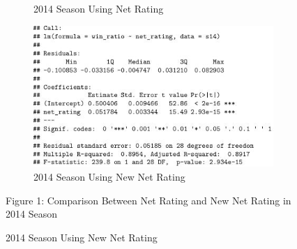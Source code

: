 \documentclass[11pt]{article}
\begin{document}
\begin{figure}[h!]
\begin{subfigure}[b]{0.42\linewidth}
    \caption{2014 Season Using Net Rating}
  \end{subfigure}
  \begin{subfigure}[b]{0.42\linewidth}
    \includegraphics[width=\linewidth]{new_nr_14_summary.jpg}
    \caption{2014 Season Using New Net Rating}
  \end{subfigure}
\bigskip
Figure 1: Comparison Between Net Rating and New Net Rating in 2014 Season
\end{figure}
\end{document}
